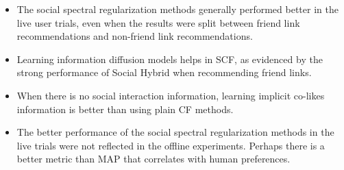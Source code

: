 \begin{itemize}
\item{The social spectral regularization methods generally performed better in the live user trials, even when the results were split between friend link recommendations and non-friend link recommendations.}

\item{Learning information diffusion models helps in SCF, as evidenced by the strong performance of Social Hybrid when recommending friend links.}

\item{When there is no social interaction information, learning implicit co-likes information is better than using plain CF methods.}

\item{The better performance of the social spectral regularization methods in the live trials were not reflected in the offline experiments. Perhaps there is a better metric than MAP that correlates with human preferences.}

\end{itemize}

